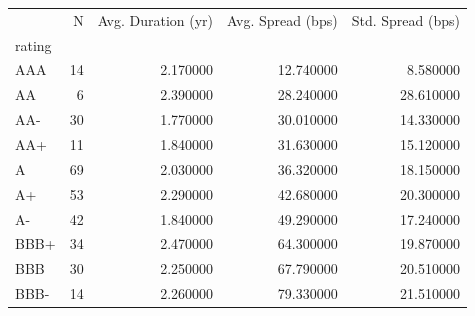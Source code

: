 \begin{tabular}{lrrrr}
\toprule
 & N & Avg. Duration (yr) & Avg. Spread (bps) & Std. Spread (bps) \\
rating &  &  &  &  \\
\midrule
AAA & 14 & 2.170000 & 12.740000 & 8.580000 \\
AA & 6 & 2.390000 & 28.240000 & 28.610000 \\
AA- & 30 & 1.770000 & 30.010000 & 14.330000 \\
AA+ & 11 & 1.840000 & 31.630000 & 15.120000 \\
A & 69 & 2.030000 & 36.320000 & 18.150000 \\
A+ & 53 & 2.290000 & 42.680000 & 20.300000 \\
A- & 42 & 1.840000 & 49.290000 & 17.240000 \\
BBB+ & 34 & 2.470000 & 64.300000 & 19.870000 \\
BBB & 30 & 2.250000 & 67.790000 & 20.510000 \\
BBB- & 14 & 2.260000 & 79.330000 & 21.510000 \\
\bottomrule
\end{tabular}
